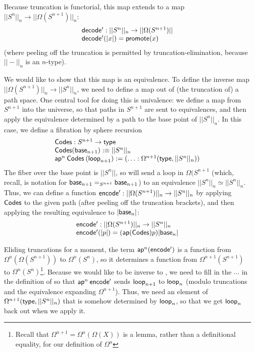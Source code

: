 Because truncation is functorial, this map extends to a map $||S^n||_n
\to ||\Omega(S^{n+1})||_n$:
\[
\begin{array}{l}
\mathsf{decode'} : ||S^n||_n \to ||\Omega(S^{n+1})|| \\
\mathsf{decode'}(|x|) = \mathsf{promote}(x)
\end{array}
\]
(where peeling off the truncation is permitted by
truncation-elimination, because $||-||_n$ is an $n$-type).

We would like to show that this map is an equivalence.  To define the
inverse map $||\Omega(S^{n+1})||_n \to ||S^n||_n$, we need to define a
map out of (the truncation of) a path space.  One central tool for doing
this is univalence: we define a map from $S^{n+1}$ into the universe, so
that paths in $S^{n+1}$ are sent to equivalences, and then apply the
equivalence determined by a path to the base point of $||S^n||_n$.  In
this case, we define a fibration  by sphere recursion
\[
\begin{array}{l}
\mathsf{Codes} : S^{n+1} \to \mathsf{type} \\
\mathsf{Codes}(\mathsf{base}_{n+1}) :\equiv ||S^{n}||_n \\
\mathsf{ap}^n \: \mathsf{Codes} \: (\mathsf{loop}_{n+1}) := (\ldots : \Omega^{n+1}(\mathsf{type},||S^{n}||_n)) \\
\end{array}
\]
The fiber over the base point is $||S^{n}||$, so  will send a
loop in $\Omega(S^{n+1}$ (which, recall, is notation for $\mathsf{base}_{n+1}
=_{S^{n+1}} \mathsf{base}_{n+1}$) to an equivalence $||S^{n}||_n \simeq
||S^{n}||_n$.  Thus, we can define a function $\mathsf{encode'} : ||\Omega(S^{n+1})||_n \to
||S^n||_n$ by applying $\mathsf{Codes}$ to the given path (after peeling
off the truncation brackets), and then
applying the resulting equivalence to $|\mathsf{base}_n|$:
\[
\begin{array}{l}
\mathsf{encode'} : ||\Omega(S^{n+1})||_n \to ||S^n||_n \\
\mathsf{encode'}(|p|) = (\mathsf{ap}(\mathsf{Codes}) p) |\mathsf{base}_n|
\end{array}
\]

Eliding truncations for a moment, the term $\mathsf{ap}^n(\mathsf{encode'})$
is a function from $\Omega^n(\Omega(S^{n+1}))$ to $\Omega^n(S^n)$, so it
determines a function from $\Omega^{n+1}(S^{n+1})$ to
$\Omega^n(S^n)$\footnote{Recall that $\Omega^{n+1} =
  \Omega^n(\Omega(X))$ is a lemma, rather than a definitional equality,
  for our definition of $\Omega^n$}.  Because we would like 
to be inverse to , we need to fill in the $\ldots$ in the
definition of  so that $\mathsf{ap}^n \: \mathsf{encode'}$ sends
$\mathsf{loop}_{n+1}$ to $\mathsf{loop}_n$ (modulo truncations and the
equivalence expanding $\Omega^{n+1}$).  Thus, we need an element of
$\Omega^{n+1}(\mathsf{type},||S^n||_n)$ that is somehow determined by 
$\mathsf{loop}_n$, so that we get $\mathsf{loop}_n$ back out when we apply it.  

